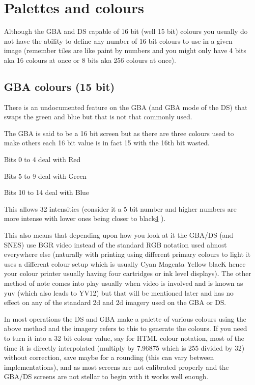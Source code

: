 \documentclass[
]{book}
\begin{document}
\hypertarget{palettes-and-colours}{%
\section{Palettes and colours}\label{palettes-and-colours}}

Although the GBA and DS capable of 16 bit (well 15 bit) colours you usually do not have the ability to define any number of 16 bit colours to use in a given image (remember tiles are like paint by numbers and you might only have 4 bits aka 16 colours at once or 8 bits aka 256 colours at once).

\hypertarget{gba-colours-15-bit}{%
\subsection{GBA colours (15 bit)}\label{gba-colours-15-bit}}

There is an undocumented feature on the GBA (and GBA mode of the DS) that swaps the green and blue but that is not that commonly used.

The GBA is said to be a 16 bit screen but as there are three colours used to make others each 16 bit value is in fact 15 with the 16th bit wasted.

Bits 0 to 4 deal with Red

Bits 5 to 9 deal with Green

Bits 10 to 14 deal with Blue

This allows 32 intensities (consider it a 5 bit number and higher numbers are more intense with lower ones being closer to black\href{romhacking20205.html\#fn4x0}{4} ).

This also means that depending upon how you look at it the GBA/DS (and SNES) use BGR video instead of the standard RGB notation used almost everywhere else (naturally with printing using different primary colours to light it uses a different colour setup which is usually Cyan Magenta Yellow blacK hence your colour printer usually having four cartridges or ink level displays). The other method of note comes into play usually when video is involved and is known as yuv (which also leads to YV12) but that will be mentioned later and has no effect on any of the standard 2d and 2d imagery used on the GBA or DS.

In most operations the DS and GBA make a palette of various colours using the above method and the imagery refers to this to generate the colours. If you need to turn it into a 32 bit colour value, say for HTML colour notation, most of the time it is directly interpolated (multiply by 7.96875 which is 255 divided by 32) without correction, save maybe for a rounding (this can vary between implementations), and as most screens are not calibrated properly and the GBA/DS screens are not stellar to begin with it works well enough.
\end{document}
